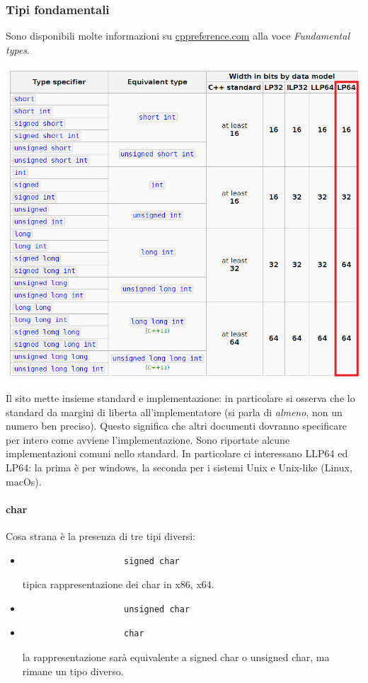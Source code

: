 			\subsubsection{Tipi fondamentali} 
			Sono disponibili molte informazioni su \url{cppreference.com} alla voce \emph{Fundamental types}.
			\begin{center}
				\includegraphics[scale=0.90]{img/13.PNG}
			\end{center} 
			Il sito mette insieme standard e implementazione: in particolare si osserva che lo standard da margini di liberta all'implementatore (si parla di \emph{almeno}, non un numero ben preciso). Questo significa che altri documenti dovranno specificare per intero come avviene l'implementazione. Sono riportate alcune implementazioni comuni nello standard. In particolare ci interessano LLP64 ed LP64: la prima è per windows, la seconda per i sistemi Unix e Unix-like (Linux, macOs).
			\clearpage 
			
			\paragraph{char} Cosa strana è la presenza di tre tipi diversi:
			\begin{itemize}
				\item \begin{verbatim}
					signed char
				\end{verbatim}
				tipica rappresentazione dei char in x86, x64.
				\item \begin{verbatim}
					unsigned char
				\end{verbatim}
				\item \begin{verbatim}
					char
				\end{verbatim}
				la rappresentazione sarà equivalente a signed char o unsigned char, ma rimane un tipo diverso.
			\end{itemize}
